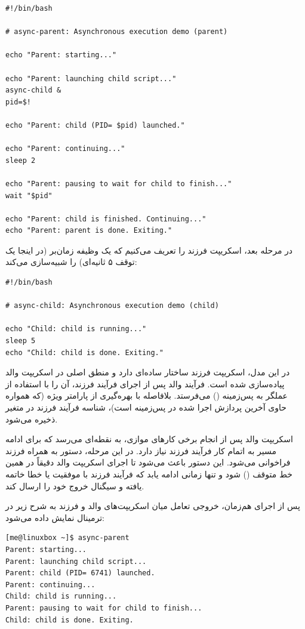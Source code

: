 \begin{latin}
\begin{lstlisting}
#!/bin/bash

# async-parent: Asynchronous execution demo (parent)

echo "Parent: starting..."

echo "Parent: launching child script..."
async-child &
pid=$!

echo "Parent: child (PID= $pid) launched."

echo "Parent: continuing..."
sleep 2

echo "Parent: pausing to wait for child to finish..."
wait "$pid"

echo "Parent: child is finished. Continuing..."
echo "Parent: parent is done. Exiting."
\end{lstlisting}
\end{latin}

در مرحله بعد، اسکریپت فرزند را تعریف می‌کنیم که یک وظیفه زمان‌بر (در اینجا یک توقف ۵ ثانیه‌ای) را شبیه‌سازی می‌کند:

\begin{latin}
\begin{lstlisting}
#!/bin/bash

# async-child: Asynchronous execution demo (child)

echo "Child: child is running..."
sleep 5
echo "Child: child is done. Exiting."
\end{lstlisting}
\end{latin}

در این مدل، اسکریپت فرزند ساختار ساده‌ای دارد و منطق اصلی در اسکریپت والد پیاده‌سازی شده است. فرآیند والد پس از اجرای فرآیند فرزند، آن را با استفاده از عملگر \cmd{\&} به پس‌زمینه () می‌فرستد. بلافاصله با بهره‌گیری از پارامتر ویژه \cmd{\$!} (که همواره حاوی  آخرین پردازش اجرا شده در پس‌زمینه است)، شناسه فرآیند فرزند در متغیر  ذخیره می‌شود.

اسکریپت والد پس از انجام برخی کارهای موازی، به نقطه‌ای می‌رسد که برای ادامه مسیر به اتمام کار فرآیند فرزند نیاز دارد. در این مرحله، دستور  به همراه  فرزند فراخوانی می‌شود. این دستور باعث می‌شود تا اجرای اسکریپت والد دقیقاً در همین خط متوقف () شود و تنها زمانی ادامه یابد که فرآیند فرزند با موفقیت یا خطا خاتمه یافته و سیگنال خروج خود را ارسال کند.

پس از اجرای هم‌زمان، خروجی تعامل میان اسکریپت‌های والد و فرزند به شرح زیر در ترمینال نمایش داده می‌شود:

\begin{latin}
\begin{lstlisting}
[me@linuxbox ~]$ async-parent
Parent: starting...
Parent: launching child script...
Parent: child (PID= 6741) launched.
Parent: continuing...
Child: child is running...
Parent: pausing to wait for child to finish...
Child: child is done. Exiting.
\end{lstlisting}
\end{latin}

